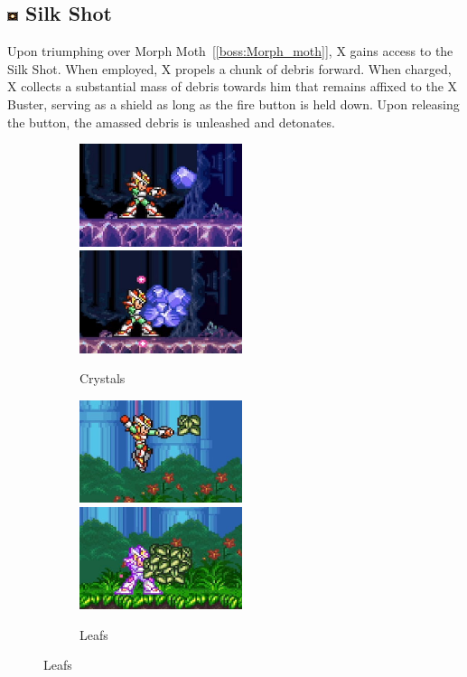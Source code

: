 \subsection{\includegraphics[width=12px, height=10px]{figures/X2/weapons/S_shot.png} Silk Shot}\label{Silk_shot}
Upon triumphing over Morph Moth~[\ref{boss:Morph_moth}], X gains access to the Silk Shot. When employed, X propels a chunk of debris forward. When charged, X collects a substantial mass of debris towards him that remains affixed to the X Buster, serving as a shield as long as the fire button is held down. Upon releasing the button, the amassed debris is unleashed and detonates.

\begin{figure}[htp]
	\begin{subfigure}{\linewidth}
		\centering
		\includegraphics[height=3cm]{figures/X2/weapons/S_shot_1.png}	
		\includegraphics[height=3cm]{figures/X2/weapons/S_shot_2.png}	
		\caption{Crystals}	
	\end{subfigure}
	\begin{subfigure}{\linewidth}
		\centering
		\includegraphics[height=3cm]{figures/X2/weapons/S_shot_3.png}	
		\includegraphics[height=3cm]{figures/X2/weapons/S_shot_4.png}	
		\caption{Leafs}
	\end{subfigure}
\end{figure}
